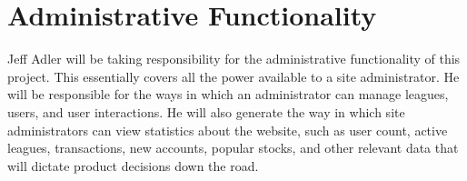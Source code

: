 \documentclass[11pt,letterpaper,oneside]{memoir}
\begin{document}
\section{Administrative Functionality}

Jeff Adler will be taking responsibility for the administrative functionality of this project. This essentially
covers all the power available to a site administrator. He will be responsible for the ways in which an
administrator can manage leagues, users, and user interactions. He will also generate the way in which
site administrators can view statistics about the website, such as user count, active leagues, transactions,
new accounts, popular stocks, and other relevant data that will dictate product decisions down the road.
\end{document}
